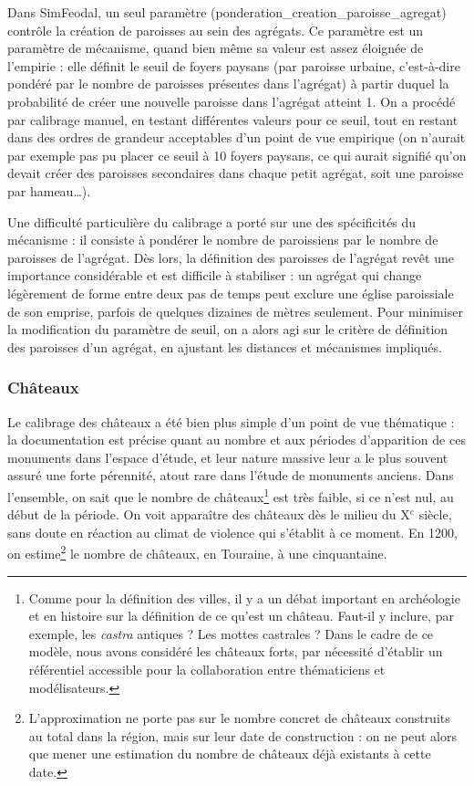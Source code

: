 Dans SimFeodal, un seul paramètre (\textsf{ponderation\_creation\_paroisse\_agregat}) contrôle la création de paroisses au sein des agrégats.
Ce paramètre est un \og paramètre de mécanisme\fg{}, quand bien même sa valeur est assez éloignée de l'empirie : elle définit le seuil de foyers paysans (par paroisse urbaine, c'est-à-dire pondéré par le nombre de paroisses présentes dans l'agrégat) à partir duquel la probabilité de créer une nouvelle paroisse dans l'agrégat atteint 1.
On a procédé par calibrage manuel, en testant différentes valeurs pour ce seuil, tout en restant dans des ordres de grandeur acceptables d'un point de vue empirique (on n'aurait par exemple pas pu placer ce seuil à 10 foyers paysans, ce qui aurait signifié qu'on devait créer des paroisses secondaires dans chaque petit agrégat, soit une paroisse par hameau\ldots).

Une difficulté particulière du calibrage a porté sur une des spécificités du mécanisme : il consiste à pondérer le nombre de paroissiens par le nombre de paroisses de l'agrégat.
Dès lors, la définition des \og paroisses de l'agrégat\fg{} revêt une importance considérable et est difficile à stabiliser : un agrégat qui change légèrement de forme entre deux pas de temps peut \og exclure\fg{} une église paroissiale de son emprise, parfois de quelques dizaines de mètres seulement.
Pour minimiser la modification du paramètre de seuil, on a alors agi sur le critère de définition des paroisses d'un agrégat, en ajustant les distances et mécanismes impliqués.


\subsubsection*{Châteaux}

Le calibrage des châteaux a été bien plus simple d'un point de vue thématique : la documentation est précise quant au nombre et aux périodes d'apparition de ces monuments dans l'espace d'étude, et leur nature massive leur a le plus souvent assuré une forte pérennité, atout rare dans l'étude de monuments anciens.
Dans l'ensemble, on sait que le nombre de châteaux\footnote{
	Comme pour la définition des villes, il y a un débat important en archéologie et en histoire sur la définition de ce qu'est un château. Faut-il y inclure, par exemple, les \textit{castra} antiques ? Les mottes castrales ? Dans le cadre de ce modèle, nous avons considéré les \og châteaux forts\fg{}, par nécessité d'établir un référentiel accessible pour la collaboration entre thématiciens et modélisateurs.
} est très faible, si ce n'est nul, au début de la période.
On voit apparaître des châteaux dès le milieu du X$^e$ siècle, sans doute en réaction au climat de violence qui s'établit à ce moment.
En 1200, on estime\footnote{
	L'approximation ne porte pas sur le nombre concret de châteaux construits au total dans la région, mais sur leur date de construction : on ne peut alors que mener une estimation du nombre de châteaux déjà existants à cette date.
} le nombre de châteaux, en Touraine, à une cinquantaine.

